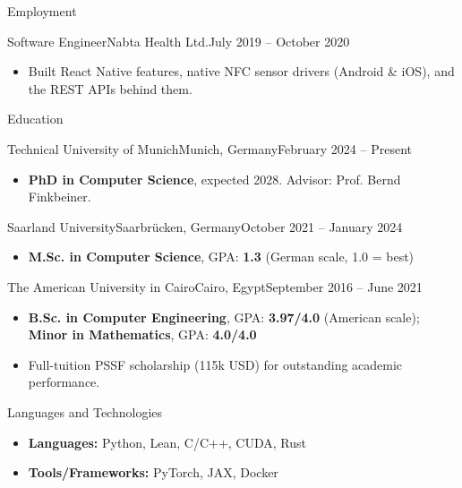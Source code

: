 \documentclass[]{mcdowellcv}
\begin{document}
\begin{cvsection}{Employment}
            \begin{cvsubsection}{Software Engineer}{Nabta Health Ltd.}{July 2019 -- October 2020}
			\begin{itemize}
				\item Built React Native features, native NFC sensor drivers (Android \& iOS), and the REST APIs behind them.
			\end{itemize}
		\end{cvsubsection}
	\end{cvsection}

	\vspace{-0.5em}
	\begin{cvsection}{Education}
    \begin{cvsubsection}{Technical University of Munich}{Munich, Germany}{February 2024 -- Present}
			\begin{itemize}
				\item \textbf{PhD in Computer Science}, expected 2028. Advisor: Prof. Bernd Finkbeiner.
			\end{itemize}
		\end{cvsubsection}
		\begin{cvsubsection}{Saarland University}{Saarbrücken, Germany}{October 2021 -- January 2024}
			\begin{itemize}
				\item \textbf{M.Sc. in Computer Science}, GPA: \textbf{1.3} (German scale, 1.0 = best)
			\end{itemize}
		\end{cvsubsection}

            \begin{cvsubsection}{The American University in Cairo}{Cairo, Egypt}{September 2016 -- June 2021}
			\begin{itemize}
				\item \textbf{B.Sc. in Computer Engineering}, GPA: \textbf{3.97/4.0} (American scale); \textbf{Minor in Mathematics}, GPA: \textbf{4.0/4.0}
				\item Full-tuition PSSF scholarship (115k USD) for outstanding academic performance.
			\end{itemize}
		\end{cvsubsection}
	\end{cvsection}

	\vspace{-0.5em}
	\begin{cvsection}{Languages and Technologies}
		\begin{cvsubsection}{}{}{}
			\begin{itemize}
				\item \textbf{Languages:} Python, Lean, C/C++, CUDA, Rust
				\item \textbf{Tools/Frameworks:} PyTorch, JAX, Docker
			\end{itemize}
		\end{cvsubsection}
	\end{cvsection}
        \vspace{-1em}
\end{document}
